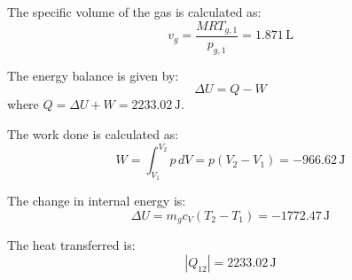The specific volume of the gas is calculated as:  
\[
v_g = \frac{M R T_{g,1}}{p_{g,1}} = 1.871 \, \text{L}
\]  

The energy balance is given by:  
\[
\Delta U = Q - W
\]  
where \( Q = \Delta U + W = 2233.02 \, \text{J} \).  

The work done is calculated as:  
\[
W = \int_{V_1}^{V_2} p \, dV = p (V_2 - V_1) = -966.62 \, \text{J}
\]  

The change in internal energy is:  
\[
\Delta U = m_g c_V (T_2 - T_1) = -1772.47 \, \text{J}
\]  

The heat transferred is:  
\[
|Q_{12}| = 2233.02 \, \text{J}
\]